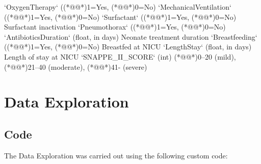 \documentclass[11pt]{article}
\begin{document}
\begin{codeoutput}
`OxygenTherapy` ((*@@*)1=Yes, (*@@*)0=No)
`MechanicalVentilation` ((*@@*)1=Yes, (*@@*)0=No)
`Surfactant` ((*@@*)1=Yes, (*@@*)0=No) Surfactant inactivation
`Pneumothorax` ((*@@*)1=Yes, (*@@*)0=No)
`AntibioticsDuration` (float, in days) Neonate treatment duration
`Breastfeeding` ((*@@*)1=Yes, (*@@*)0=No) Breastfed at NICU
`LengthStay` (float, in days) Length of stay at NICU
`SNAPPE\_II\_SCORE` (int) (*@@*)0--20 (mild), (*@@*)21--40 (moderate), (*@@*)41- (severe)



\end{codeoutput}

\section{Data Exploration}
\subsection{{Code}}
The Data Exploration was carried out using the following custom code:
\end{document}
